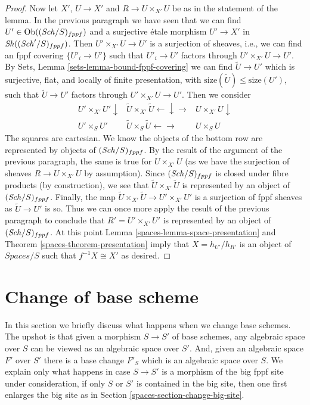 \begin{proof}
\medskip\noindent
Now let $X'$, $U \to X'$ and $R \to U \times_{X'} U$ be as in the
statement of the lemma. In the previous paragraph we have seen that
we can find $U' \in \operatorname{Ob}((\mathit{Sch}/S)_{fppf})$ and a surjective \'etale morphism
$U' \to X'$ in $\mathit{Sh}((\mathit{Sch}'/S)_{fppf})$. Then
$U' \times_{X'} U \to U'$ is a surjection of sheaves, i.e., we can find an fppf
covering $\{U'_i \to U'\}$ such that $U'_i \to U'$ factors through
$U' \times_{X'} U \to U'$.
By Sets, Lemma \ref{sets-lemma-bound-fppf-covering}
we can find
$\tilde U \to U'$
which is surjective, flat, and locally of finite presentation,
with $\text{size}(\tilde U) \leq \text{size}(U')$,
such that $\tilde U \to U'$ factors through
$U' \times_{X'} U \to U'$. Then we consider
$$
\begin{array}{ccc}U' \times_{X'} U' \downarrow & \tilde U \times_{X'} \tilde U  \longleftarrow\downarrow\longrightarrow & U \times_{X'} U \downarrow \\ U' \times_S U' & \tilde U \times_S \tilde U \longleftarrow\longrightarrow & U \times_S U\end{array}
$$
The squares are cartesian. We know the objects of the bottom row
are represented by objects of $(\mathit{Sch}/S)_{fppf}$. By the result of the
argument of the previous paragraph, the same is true for $U \times_{X'} U$
(as we have the surjection of sheaves $R \to U \times_{X'} U$
by assumption). Since $(\mathit{Sch}/S)_{fppf}$ is closed under fibre
products (by construction), we see that $\tilde U \times_{X'} \tilde U$
is represented by an object of $(\mathit{Sch}/S)_{fppf}$. Finally, the
map $\tilde U \times_{X'} \tilde U \to U' \times_{X'} U'$ is
a surjection of fppf sheaves as $\tilde U \to U'$ is so.
Thus we can once more apply the result of the previous paragraph
to conclude that $R' = U' \times_{X'} U'$ is represented by an object
of $(\mathit{Sch}/S)_{fppf}$. At this point
Lemma \ref{spaces-lemma-space-presentation} and
Theorem \ref{spaces-theorem-presentation} imply that $X = h_{U'}/h_{R'}$
is an object of $\textit{Spaces}/S$ such that $f^{-1}X \cong X'$
as desired.
\end{proof}

\section{Change of base scheme}
\label{spaces-section-change-base-scheme}
In this section we briefly discuss what happens when we change base schemes.
The upshot is that given a morphism $S \to S'$ of base schemes, any algebraic
space over $S$ can be viewed as an algebraic space over $S'$. And, given an
algebraic space $F'$ over $S'$ there is a base change $F'_S$ which is
an algebraic space over $S$.
We explain only what happens in case $S \to S'$ is a morphism of the
big fppf site under consideration, if only $S$ or $S'$ is contained in the
big site, then one first enlarges the big site as in
Section \ref{spaces-section-change-big-site}.

